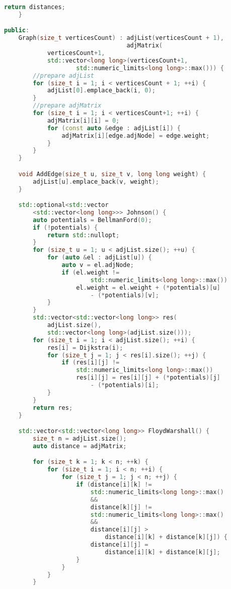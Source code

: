 \documentclass[12pt]{article}
\begin{document}
\begin{itemize}
\begin{lstlisting}[language=C++]
        return distances;
    }

public:
    Graph(size_t verticesCount) : adjList(verticesCount + 1),
                                  adjMatrix(
            verticesCount+1,
            std::vector<long long>(verticesCount+1, 
                    std::numeric_limits<long long>::max())) {
        //prepare adjList
        for (size_t i = 1; i < verticesCount + 1; ++i) {
            adjList[0].emplace_back(i, 0);
        }
        //prepare adjMatrix
        for (size_t i = 1; i < verticesCount+1; ++i) {
            adjMatrix[i][i] = 0;
            for (const auto &edge : adjList[i]) {
                adjMatrix[i][edge.adjNode] = edge.weight;
            }
        }
    }

    void AddEdge(size_t u, size_t v, long long weight) {
        adjList[u].emplace_back(v, weight);
    }

    std::optional<std::vector
        <std::vector<long long>>> Johnson() {
        auto potentials = BellmanFord(0);
        if (!potentials) {
            return std::nullopt;
        }
        for (size_t u = 1; u < adjList.size(); ++u) {
            for (auto &el : adjList[u]) {
                auto v = el.adjNode;
                if (el.weight != 
                        std::numeric_limits<long long>::max())
                    el.weight = el.weight + (*potentials)[u] 
                        - (*potentials)[v];
            }
        }
        std::vector<std::vector<long long>> res(
            adjList.size(),
            std::vector<long long>(adjList.size()));
        for (size_t i = 1; i < adjList.size(); ++i) {
            res[i] = Dijkstra(i);
            for (size_t j = 1; j < res[i].size(); ++j) {
                if (res[i][j] != 
                    std::numeric_limits<long long>::max())
                    res[i][j] = res[i][j] + (*potentials)[j] 
                        - (*potentials)[i];
            }
        }
        return res;
    }

    std::vector<std::vector<long long>> FloydWarshall() {
        size_t n = adjList.size();
        auto distance = adjMatrix;

        for (size_t k = 1; k < n; ++k) {
            for (size_t i = 1; i < n; ++i) {
                for (size_t j = 1; j < n; ++j) {
                    if (distance[i][k] !=
                        std::numeric_limits<long long>::max()
                        &&
                        distance[k][j] !=
                        std::numeric_limits<long long>::max() 
                        &&
                        distance[i][j] > 
                            distance[i][k] + distance[k][j]) {
                        distance[i][j] = 
                            distance[i][k] + distance[k][j];
                    }
                }
            }
        }


\end{lstlisting}
\end{itemize}
\end{document}
